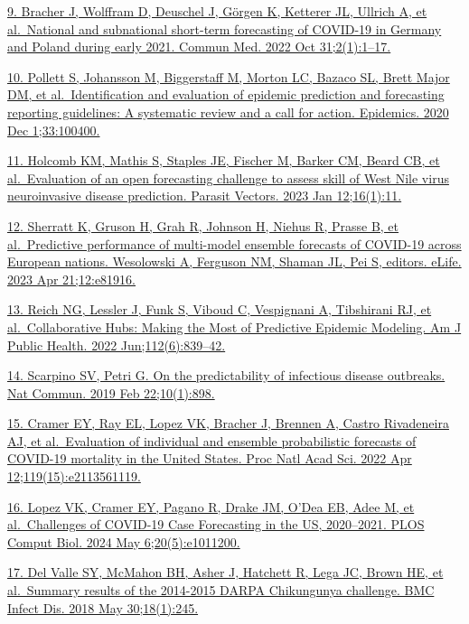 \documentclass[
  letterpaper,
  DIV=11,
  numbers=noendperiod]{scrartcl}
\begin{document}
\begin{tcolorbox}
\href{https://www.zotero.org/google-docs/?7SKDbN}{9. Bracher J, Wolffram
D, Deuschel J, Görgen K, Ketterer JL, Ullrich A, et al.~National and
subnational short-term forecasting of COVID-19 in Germany and Poland
during early 2021. Commun Med. 2022 Oct 31;2(1):1--17.}

\href{https://www.zotero.org/google-docs/?7SKDbN}{10. Pollett S,
Johansson M, Biggerstaff M, Morton LC, Bazaco SL, Brett Major DM, et
al.~Identification and evaluation of epidemic prediction and forecasting
reporting guidelines: A systematic review and a call for action.
Epidemics. 2020 Dec 1;33:100400.}

\href{https://www.zotero.org/google-docs/?7SKDbN}{11. Holcomb KM, Mathis
S, Staples JE, Fischer M, Barker CM, Beard CB, et al.~Evaluation of an
open forecasting challenge to assess skill of West Nile virus
neuroinvasive disease prediction. Parasit Vectors. 2023 Jan
12;16(1):11.}

\href{https://www.zotero.org/google-docs/?7SKDbN}{12. Sherratt K, Gruson
H, Grah R, Johnson H, Niehus R, Prasse B, et al.~Predictive performance
of multi-model ensemble forecasts of COVID-19 across European nations.
Wesolowski A, Ferguson NM, Shaman JL, Pei S, editors. eLife. 2023 Apr
21;12:e81916.}

\href{https://www.zotero.org/google-docs/?7SKDbN}{13. Reich NG, Lessler
J, Funk S, Viboud C, Vespignani A, Tibshirani RJ, et al.~Collaborative
Hubs: Making the Most of Predictive Epidemic Modeling. Am J Public
Health. 2022 Jun;112(6):839--42.}

\href{https://www.zotero.org/google-docs/?7SKDbN}{14. Scarpino SV, Petri
G. On the predictability of infectious disease outbreaks. Nat Commun.
2019 Feb 22;10(1):898.}

\href{https://www.zotero.org/google-docs/?7SKDbN}{15. Cramer EY, Ray EL,
Lopez VK, Bracher J, Brennen A, Castro Rivadeneira AJ, et al.~Evaluation
of individual and ensemble probabilistic forecasts of COVID-19 mortality
in the United States. Proc Natl Acad Sci. 2022 Apr
12;119(15):e2113561119.}

\href{https://www.zotero.org/google-docs/?7SKDbN}{16. Lopez VK, Cramer
EY, Pagano R, Drake JM, O'Dea EB, Adee M, et al.~Challenges of COVID-19
Case Forecasting in the US, 2020--2021. PLOS Comput Biol. 2024 May
6;20(5):e1011200.}

\href{https://www.zotero.org/google-docs/?7SKDbN}{17. Del Valle SY,
McMahon BH, Asher J, Hatchett R, Lega JC, Brown HE, et al.~Summary
results of the 2014-2015 DARPA Chikungunya challenge. BMC Infect Dis.
2018 May 30;18(1):245.}


\end{tcolorbox}
\end{document}
